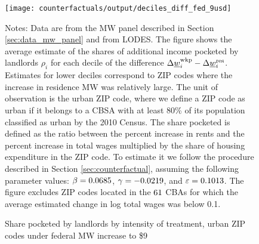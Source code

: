 \begin{figure}[h!]
    \centering
    \caption{Share pocketed by landlords by intensity of treatment, 
             urban ZIP codes under federal MW increase to \$9}
    \label{fig:rho_by_decile_MW_gap}

	\texttt{[image: counterfactuals/output/deciles\_diff\_fed\_9usd]}

    \begin{minipage}{.95\textwidth} \footnotesize
        \vspace{3mm}
        Notes:
        Data are from the MW panel described in Section \ref{sec:data_mw_panel} 
        and from LODES.
        The figure shows the average estimate of the shares of additional
        income pocketed by landlords $\rho_i$ for each decile of the 
        difference $\Delta \underline{w}_i^{\text{wkp}} - \Delta \underline{w}_i^{\text{res}}$.
        Estimates for lower deciles correspond to ZIP codes where the increase 
        in residence MW was relatively large.
        The unit of observation is the urban ZIP code, where we define a ZIP code 
        as urban if it belongs to a CBSA with at least 80\% of its population 
        classified as urban by the 2010 Census.
        The share pocketed is defined as the ratio between the percent increase 
        in rents and the percent increase in total wages multiplied by the share 
        of housing expenditure in the ZIP code.
        To estimate it we follow the procedure described in Section 
        \ref{sec:counterfactual}, assuming the following parameter values: 
        $\beta = 0.0685$, $\gamma = -0.0219$, and $\varepsilon = 0.1013$.
        The figure excludes ZIP codes located in the $\textnormal{61}$ CBAs for which the average
        estimated change in log total wages was below 0.1.
    \end{minipage}
\end{figure}
